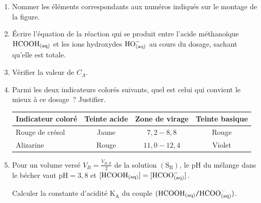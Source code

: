 \begin{enumerate}
    \item Nommer les éléments correspondants aux numéros indiqués sur le montage
          de la figure.
    \item Écrire l'équation de la réaction qui se produit entre l'acide
          méthanoïque $\ce{HCOOH_{(aq)}}$ et les ions hydroxydes
          $\ce{HO^-_{(aq)}}$ au cours du dosage, sachant qu'elle est totale.
    \item Vérifier la valeur de $C_{A}$.
    \item Parmi les deux indicateurs colorés suivants, quel est celui qui
          convient le mieux à ce dosage~? Justifier.

          \begin{minipage}{\linewidth}
              \begin{table}[H]
                  \centering
                  \renewcommand{\arraystretch}{1.5}
                  \begin{tabularx}{\textwidth}{|p{4cm}|C|C|C|}
                  \hline
                  \textbf{Indicateur coloré} & \textbf{Teinte acide} &
                  \textbf{Zone de virage} & \textbf{Teinte basique} \\
                  \hline
                  Rouge de crésol & Jaune & $7,2-8,8$ & Rouge \\
                  \hline
                  Alizarine & Rouge & $11,0-12,4$ & Violet \\
                  \hline
                  \end{tabularx}
              \end{table}
          \end{minipage}
    \item Pour un volume versé $V_{B}=\frac{V_{B,E}}{2}$ de la solution
          $\mathrm{(S_{B})}$, le $\mathrm{pH}$ du mélange dans le bécher vaut
          $\mathrm{pH}=3,8$ et $[\ce{HCOOH_{(aq)}}]=[\ce{HCOO^-_{(aq)}}]$.

          Calculer la constante d'acidité $\mathrm{K_{A}}$ du couple
          $(\ce{HCOOH_{(aq)}}\ttslash{}\ce{HCOO^-_{(aq)}})$.
\end{enumerate}


